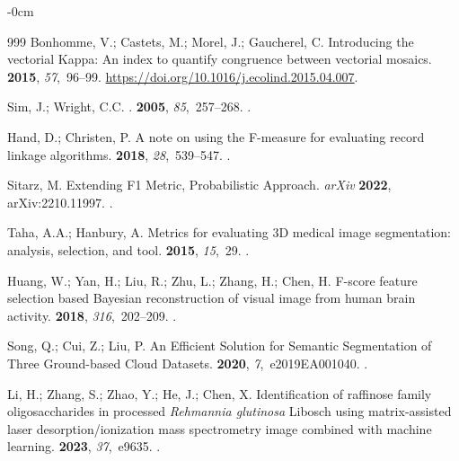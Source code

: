 \documentclass[jmse,article,accept,pdftex,oneauthor]{Definitions/mdpi}
\begin{document}
\begin{adjustwidth}{-\extralength}{0cm}
\begin{thebibliography}{999}
Bonhomme, V.; Castets, M.; Morel, J.; Gaucherel, C.
\newblock Introducing the vectorial Kappa: An index to quantify congruence
  between vectorial mosaics.
 {\bf 2015}, {\em 57},~96--99.
\newblock
  {\url{https://doi.org/10.1016/j.ecolind.2015.04.007}}.

Sim, J.; Wright, C.C.
.
 {\bf 2005}, {\em 85},~257--268.
.

Hand, D.; Christen, P.
\newblock A note on using the F-measure for evaluating record linkage
  algorithms.
 {\bf 2018}, {\em 28},~539--547.
.

Sitarz, M.
\newblock Extending F1 Metric, Probabilistic Approach. \emph{arXiv} \textbf{2022}, arXiv:2210.11997.
  \href{http://xxx.lanl.gov/abs/2210.11997}{{\normalfont
  [arXiv:cs.LG/2210.11997]}}.

Taha, A.A.; Hanbury, A.
\newblock Metrics for evaluating 3D medical image segmentation: analysis,
  selection, and tool.
 {\bf 2015}, {\em 15},~29.
.

Huang, W.; Yan, H.; Liu, R.; Zhu, L.; Zhang, H.; Chen, H.
\newblock F-score feature selection based Bayesian reconstruction of visual
  image from human brain activity.
 {\bf 2018}, {\em 316},~202--209.
.

Song, Q.; Cui, Z.; Liu, P.
\newblock An Efficient Solution for Semantic Segmentation of Three Ground-based
  Cloud Datasets.
 {\bf 2020}, {\em 7},~e2019EA001040.
.

Li, H.; Zhang, S.; Zhao, Y.; He, J.; Chen, X.
\newblock Identification of raffinose family oligosaccharides in processed
  \emph{Rehmannia glutinosa} Libosch using matrix-assisted laser desorption/ionization
  mass spectrometry image combined with machine learning.
 {\bf 2023}, {\em
  37},~e9635.
.


\end{thebibliography}
\end{adjustwidth}
\end{document}
